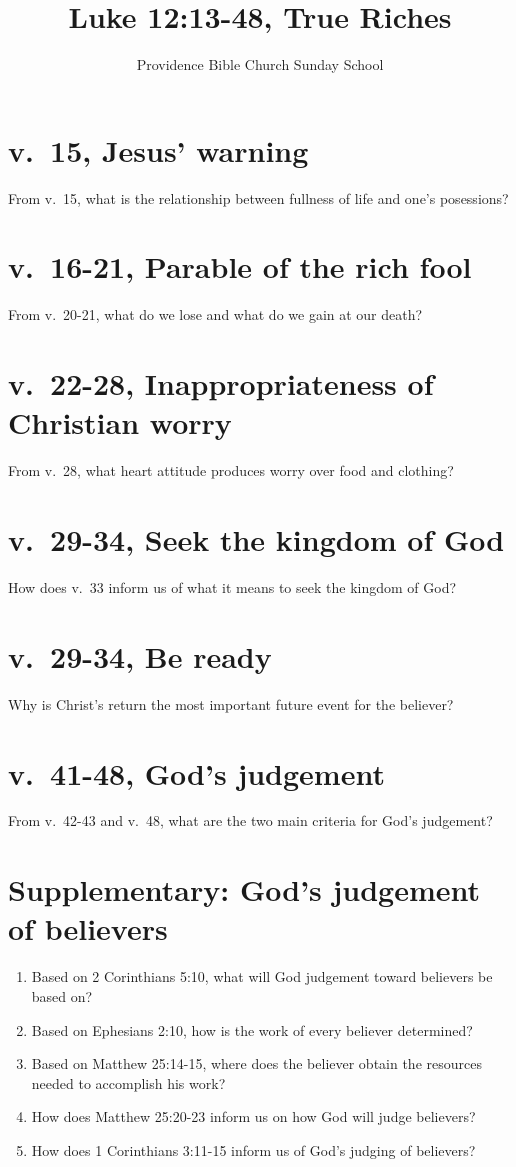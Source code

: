\documentclass[12pt]{article}
\begin{document}
\title{Luke 12:13-48, True Riches}
\author{Providence Bible Church Sunday School}
\maketitle
\section*{v.~15, Jesus' warning}
From v.~15, what is the relationship between 
    fullness of life and one's posessions?
\section*{v.~16-21, Parable of the rich fool}
From v.~20-21, what do we lose and what do we gain at our death?
\section*{v.~22-28, Inappropriateness of Christian worry}
From v.~28, what heart attitude produces worry over food and clothing?
\section*{v.~29-34, Seek the kingdom of God}
How does v.~33 inform us of what it means to seek the kingdom of God?
\section*{v.~29-34, Be ready}
Why is Christ's return the most important future event for the believer?
\section*{v.~41-48, God's judgement}
From v.~42-43 and v.~48, what are the two main criteria for God's
    judgement?

\section*{Supplementary: God's judgement of believers}
\begin{enumerate}
\item Based on 2 Corinthians 5:10, 
    what will God judgement toward believers be based on?
\item Based on Ephesians 2:10, how is the work of every believer determined?
\item Based on Matthew 25:14-15, where does the believer obtain the resources
    needed to accomplish his work?
\item How does Matthew 25:20-23 inform us on how God will judge believers?
\item How does 1 Corinthians 3:11-15 inform us of God's judging of believers?
\end{enumerate}
\end{document}
